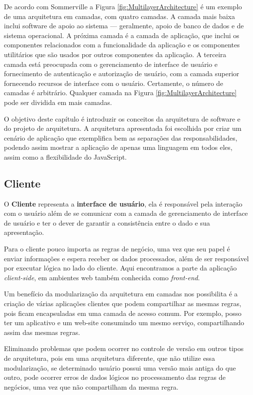 \documentclass[
	12pt,				%
	openright,			%
	twoside,			%
	a4paper,			%
	english,			%
	brazil				%
	]{abntex2}
\begin{document}
De acordo com Sommerville\cite{sommerville_engenharia} a Figura \ref{fig:MultilayerArchitecture} é um exemplo de uma arquitetura em camadas, com quatro camadas. A camada mais baixa inclui software de apoio ao sistema — geralmente, apoio de banco de dados e de sistema operacional. A próxima camada é a camada de aplicação, que inclui os componentes relacionados com a funcionalidade da aplicação e os componentes utilitários que são usados por outros componentes da aplicação. A terceira camada está preocupada com o gerenciamento de interface de usuário e fornecimento de autenticação e autorização de usuário, com a camada superior fornecendo recursos de interface com o usuário. Certamente, o número de camadas é arbitrário. Qualquer camada na Figura \ref{fig:MultilayerArchitecture} pode ser dividida em mais camadas.

O objetivo deste capítulo é introduzir os conceitos da arquitetura de software e do projeto de arquitetura. A arquitetura apresentada foi escolhida por criar um cenário de aplicação que exemplifica bem as separações das responsabilidades, podendo assim mostrar a aplicação de apenas uma linguagem em todos eles, assim como a flexibilidade do JavaScript.

\subsection{Cliente}
\label{subsec:Cliente}

O \textbf{Cliente} representa a \textbf{interface de usuário}, ela é responsável pela interação com o usuário além de se comunicar com a camada de gerenciamento de interface de usuário e ter o dever de garantir a consistência entre o dado e sua apresentação.

Para o cliente pouco importa as regras de negócio, uma vez que seu papel é enviar informações e espera receber os dados processados, além de ser responsável por executar lógica no lado do cliente. Aqui encontramos a parte da aplicação \textit{client-side}, em ambientes web também conhecida como \textit{front-end}.

Um benefício da modularização da arquitetura em camadas nos possibilita é a criação de várias aplicações clientes que podem compartilhar as mesmas regras, pois ficam encapsuladas em uma camada de acesso comum. Por exemplo, posso ter um aplicativo e um web-site consumindo um mesmo serviço, compartilhando assim das mesmas regras.

Eliminando problemas que podem ocorrer no controle de versão em outros tipos de arquitetura, pois em uma arquitetura diferente, que não utilize essa modularização, se determinado usuário possui uma versão mais antiga do que outro, pode ocorrer erros de dados lógicos no processamento das regras de negócios, uma vez que não compartilham da mesma regra.
\end{document}
